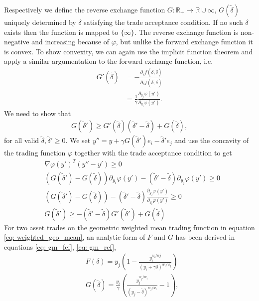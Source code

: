 Respectively we define the reverse exchange function $G: \mathbb{R}_+
\to \mathbb{R} \cup {\infty}$, $G(\tilde{\delta})$ uniquely determined by
$\delta$ satisfying the trade acceptance condition. If no such $\delta$
exists then the function is mapped to $\{\infty\}$. The reverse exchange
function is non-negative and increasing because of $\varphi$, but unlike
the forward exchange function it is convex. To show convexity, we can again
use the implicit function theorem and apply a similar argumentation to the
forward exchange function, i.e.
\begin{align}
    G'(\tilde{\delta})  &= -\frac{\partial_{\tilde{\delta}} f(\delta,
    \tilde{\delta})}{\partial_{\delta} f(\delta, \tilde{\delta})}\\
                        &=\frac{1}{\gamma} \frac{\partial_{y_j}\varphi(y')}{
                    \partial_{y_i} \varphi(y')}.
\end{align}
We need to show that
\begin{align}
    G(\tilde{\delta}') \ge G'(\tilde{\delta})(\tilde{\delta}' -
    \tilde{\delta}) + G(\tilde{\delta}),
\end{align}
for all valid $\tilde{\delta},\tilde{\delta}' \ge 0$. We set $y'' = y + \gamma
G(\tilde{\delta}')e_i - \tilde{\delta}'e_j$  and use the concavity of the
trading function $\varphi$ together with the trade acceptance condition to
get
\begin{align}
    &\nabla \varphi(y')^{T} (y'' - y') \ge 0\\
    &(G(\tilde{\delta}') - G(\tilde{\delta}))\partial_{y_i}\varphi(y')
    - (\tilde{\delta}' - \tilde{\delta})\partial_{y_j}\varphi(y') \ge 0\\
    &(G(\tilde{\delta}') - G(\tilde{\delta}))
    - (\tilde{\delta}' - \tilde{\delta})\frac{\partial_{y_j}
    \varphi(y')}{\partial_{y_i}\varphi(y')} \ge 0\\
    &G(\tilde{\delta}') \ge
    - (\tilde{\delta}' - \tilde{\delta})G'(\tilde{\delta}')
    + G(\tilde{\delta})
\end{align}
For two asset trades on the geometric weighted mean trading function in equation
\ref{eq: weighted_geo_mean}, an analytic form of $F$ and $G$ has been derived in
equations \ref{eq: gm_fef}, \ref{eq: gm_ref},
\begin{align}
&F(\delta)= y_j\left(
    1 - \frac{y_i^{w_i/wj}}{\left(y_i+\gamma \delta\right)^{w_i/w_j} }
\right) \\
&G(\tilde{\delta}) = \frac{y_i}{\gamma}\left(
\frac{y_j^{w_j/w_i}}{\left(y_j - \tilde{\delta} \right)^{w_j/w_i}} - 1
\right),
\end{align}
